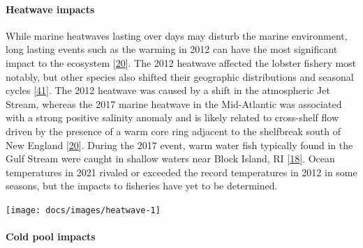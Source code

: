 \documentclass[
  10pt,
]{article}
\let\origfigure\figure
\let\endorigfigure\endfigure
\renewenvironment{figure}[1][2] {
    \expandafter\origfigure\expandafter[H]
} {
    \endorigfigure
}
\begin{document}
\hypertarget{heatwave-impacts}{%
\paragraph{Heatwave impacts}\label{heatwave-impacts}}

While marine heatwaves lasting over days may disturb the marine
environment, long lasting events such as the warming in 2012 can have
the most significant impact to the ecosystem
{[}\protect\hyperlink{ref-gawarkiewicz_characteristics_2019}{20}{]}. The
2012 heatwave affected the lobster fishery most notably, but other
species also shifted their geographic distributions and seasonal cycles
{[}\protect\hyperlink{ref-mills_fisheries_2013}{41}{]}. The 2012
heatwave was caused by a shift in the atmospheric Jet Stream, whereas
the 2017 marine heatwave in the Mid-Atlantic was associated with a
strong positive salinity anomaly and is likely related to cross-shelf
flow driven by the presence of a warm core ring adjacent to the
shelfbreak south of New England
{[}\protect\hyperlink{ref-gawarkiewicz_characteristics_2019}{20}{]}.
During the 2017 event, warm water fish typically found in the Gulf
Stream were caught in shallow waters near Block Island, RI
{[}\protect\hyperlink{ref-gawarkiewicz_changing_2018}{18}{]}. Ocean
temperatures in 2021 rivaled or exceeded the record temperatures in 2012
in some seasons, but the impacts to fisheries have yet to be determined.

\begin{figure}

{\centering \texttt{[image: docs/images/heatwave-1]} 

}

\caption{Marine heatwave cumulative intesity (left) and maximum intensity (right) in the Mid-Atlantic Bight.}\label{fig:heatwave}
\end{figure}

\hypertarget{cold-pool-impacts}{%
\paragraph{Cold pool impacts}\label{cold-pool-impacts}}
\end{document}
